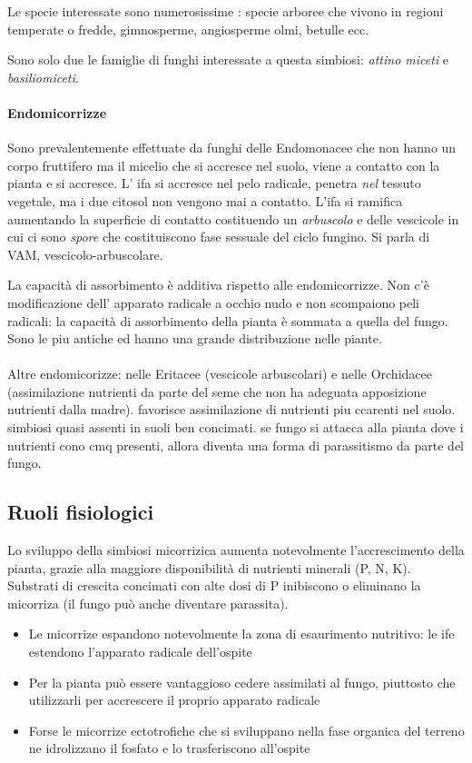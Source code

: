 \documentclass[a4paper,12pt]{book}
\begin{document}
Le specie interessate sono numerosissime : specie arboree che vivono in regioni temperate o fredde, gimnosperme, angiosperme olmi, betulle ecc.

Sono solo due le famiglie di funghi interessate a questa simbiosi: \emph{attino miceti} e \emph{basiliomiceti}.


\paragraph{Endomicorrizze}
Sono prevalentemente effettuate da funghi delle Endomonacee che non hanno un corpo fruttifero ma il micelio che si accresce nel suolo, viene a contatto con la pianta e si accresce. L' ifa si accresce nel pelo radicale, penetra \emph{nel} tessuto vegetale, ma i due citosol non vengono mai a contatto. L'ifa si ramifica aumentando  la superficie di contatto costituendo un \emph{arbuscolo} e delle vescicole in cui ci sono \emph{spore} che costituiscono fase sessuale del ciclo fungino. Si parla di VAM, vescicolo-arbuscolare.

La capacità di assorbimento è  additiva rispetto alle endomicorrizze. Non c'è modificazione dell' apparato radicale a occhio nudo e non scompaiono peli radicali: la capacità di assorbimento della pianta è sommata a quella del fungo. Sono le piu antiche ed hanno una grande distribuzione nelle piante.

\paragraph{}
Altre endomicorizze: nelle Eritacee (vescicole arbuscolari) e nelle Orchidacee (assimilazione nutrienti da parte del seme che non ha adeguata apposizione nutrienti dalla madre).
favorisce assimilazione di nutrienti piu ccarenti nel suolo. simbiosi quasi assenti in suoli ben concimati. se fungo si attacca alla pianta dove i nutrienti cono cmq presenti, allora diventa una forma di parassitismo da parte del fungo.  
\subsection{Ruoli fisiologici}
 Lo sviluppo della simbiosi micorrizica aumenta notevolmente l'accrescimento della pianta, grazie alla maggiore disponibilità di nutrienti minerali (P, N, K). Substrati di crescita concimati con alte dosi di P inibiscono o eliminano la micorriza (il fungo può anche diventare parassita).
\begin{itemize}
\item{Le micorrize espandono notevolmente la zona di esaurimento nutritivo: le ife estendono
l'apparato radicale dell'ospite}
\item{Per la pianta può essere vantaggioso cedere assimilati al fungo, piuttosto che utilizzarli per
accrescere il proprio apparato radicale}
\item{Forse le micorrize ectotrofiche che si sviluppano nella fase organica del terreno ne idrolizzano il
fosfato e lo trasferiscono all'ospite}
\end{itemize}
\end{document}
